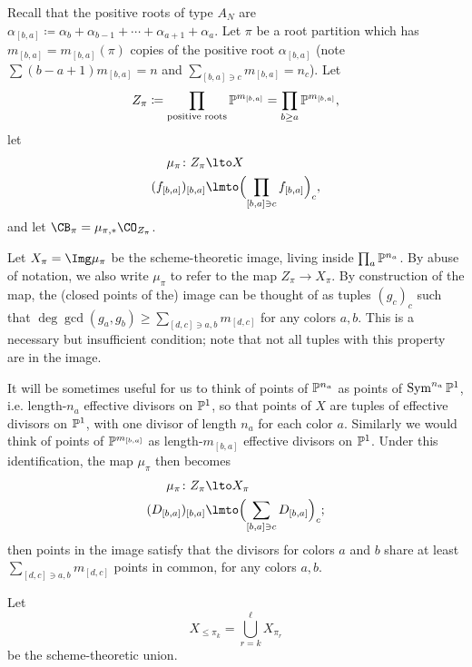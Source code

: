 \documentclass[11pt,reqno]{amsart}
\begin{document}
Recall that the positive roots of type $A_N$ are $\alpha_{[b,a]}\coloneqq \alpha_b+\alpha_{b-1}+\cdots+\alpha_{a+1}+\alpha_a$. Let $\pi$ be a root partition which has $m_{[b,a]}=m_{[b,a]}(\pi)$ copies of the positive root $\alpha_{[b,a]}$ (note $\sum (b-a+1)m_{[b,a]}=n$ and $\sum_{[b,a]\ni c}m_{[b,a]}=n_c$). Let 
\[Z_\pi\coloneqq \prod_{\text{positive roots}} \mathbb P^{m_{[b,a]}}=\prod_{b\ge a} \mathbb P^{m_{[b,a]}},\] 
let
\begin{align*}
    \mu_\pi\colon Z_\pi&\lto X\\
    (f_{[b,a]})_{[b,a]}&\lmto \Bigpr{\prod_{[b,a]\ni c} f_{[b,a]}}_c,
\end{align*}
and let $\CB_\pi=\mu_{\pi,*} \CO_{Z_\pi}$. 

Let $X_\pi=\Img\mu_\pi$ be the scheme-theoretic image, living inside $\prod_a \mathbb P^{n_a}$. By abuse of notation, we also write $\mu_\pi$ to refer to the map $Z_\pi\to X_\pi$. By construction of the map, the (closed points of the) image can be thought of as tuples $(g_c)_c$ such that $\deg\gcd(g_a,g_b)\ge \sum_{[d,c]\ni a,b}m_{[d,c]}$ for any colors $a,b$. This is a necessary but insufficient condition; note that not all tuples with this property are in the image. 

It will be sometimes useful for us to think of  points of $\mathbb P^{n_a}$ as  points of $\operatorname{Sym}^{n_a}\mathbb P^1$, i.e. length-$n_a$ effective divisors on $\mathbb P^1$, so that points of $X$ are tuples of effective divisors on $\mathbb P^1$, with one divisor of length $n_a$ for each color $a$. Similarly we would think of points of $\mathbb P^{m_{[b,a]}}$ as length-$m_{[b,a]}$ effective divisors on $\mathbb P^1$. Under this identification, the map $\mu_\pi$ then becomes 
\begin{align*}
    \mu_\pi\colon Z_\pi&\lto X_\pi\\ 
    (D_{[b,a]})_{[b,a]}&\lmto \Bigpr{\sum_{[b,a]\ni c}D_{[b,a]} }_c;
\end{align*}
then points in the image satisfy that the divisors for colors $a$ and $b$ share at least $\sum_{[d,c]\ni a,b}m_{[d,c]}$ points in common, for any colors $a,b$.

Let
\[X_{\le\pi_k}=\bigcup_{r=k}^\ell X_{\pi_r}\] 
be the scheme-theoretic union. 
\end{document}
